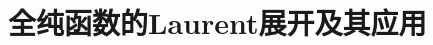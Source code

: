 \documentclass[../main.tex]{subfiles} %
\begin{document}
\chapter{全纯函数的Laurent展开及其应用}




















\end{document}
